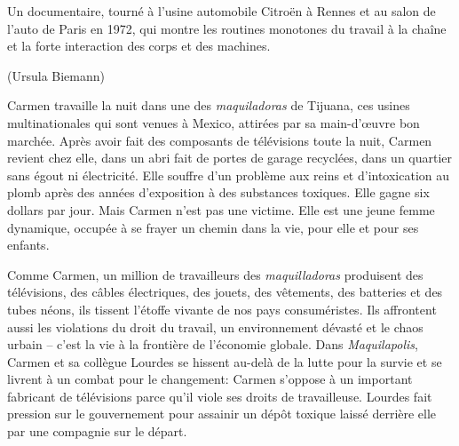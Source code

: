 {{Un documentaire, tourn\'e \`a l'usine automobile
Citro\"en \`a Rennes et au salon de l'auto de Paris en
1972, qui montre les routines monotones du travail \`a la cha\^ine et
la forte interaction des corps et des machines.

\blank
{} (Ursula Biemann)
\blank
{}


Carmen travaille la nuit dans une des {\em maquiladoras} de
Tijuana, ces usines multinationales qui sont venues \`a Mexico,
attir\'ees par sa main{}-d'{\oe}uvre bon march\'ee.
Apr\`es avoir fait des composants de t\'el\'evisions toute la nuit,
Carmen revient chez elle, dans un abri fait de portes de garage
recycl\'ees, dans un quartier sans \'egout ni \'electricit\'e. Elle
souffre d'un probl\`eme aux reins et
d'intoxication au plomb apr\`es des ann\'ees
d'exposition \`a des substances toxiques. Elle gagne
six dollars par jour. Mais Carmen n'est pas une
victime. Elle est une jeune femme dynamique, occup\'ee \`a se frayer un
chemin dans la vie, pour elle et pour ses enfants.

Comme Carmen, un million de travailleurs des {\em maquilladoras}
produisent des t\'el\'evisions, des c\^ables \'electriques, des jouets,
des v\^etements, des batteries et des tubes n\'eons, ils tissent
l'\'etoffe vivante de nos pays consum\'eristes. Ils
affrontent aussi les violations du droit du travail, un environnement
d\'evast\'e et le chaos urbain {--} c'est la vie \`a
la fronti\`ere de l'\'economie globale. Dans
{\em Maquilapolis}, Carmen et sa coll\`egue Lourdes se hissent
au{}-del\`a de la lutte pour la survie et se livrent \`a un combat pour
le changement: Carmen s'oppose \`a un important
fabricant de t\'el\'evisions parce qu'il viole ses
droits de travailleuse. Lourdes fait pression sur le gouvernement pour
assainir un d\'ep\^ot toxique laiss\'e derri\`ere elle par une
compagnie sur le d\'epart.

}}

